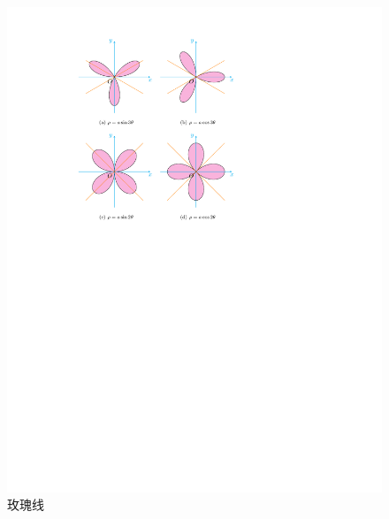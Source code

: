 \begin{figure}[H]
    \centering
    \includegraphics{figures/RoseLine.pdf}
    \caption{玫瑰线}
    \label{roseLine}
\end{figure}


